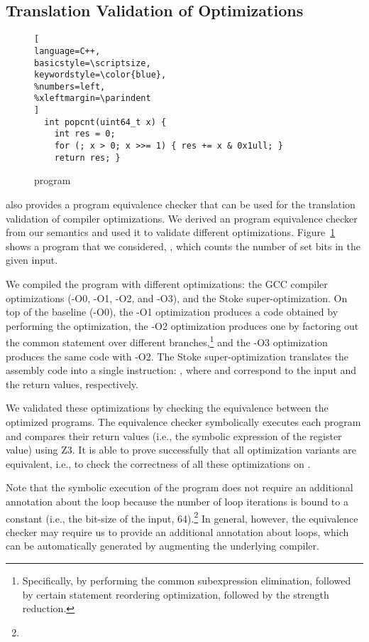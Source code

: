\subsection{Translation Validation of Optimizations}
\begin{figure}
\begin{lstlisting}[
language=C++,
basicstyle=\scriptsize,
keywordstyle=\color{blue},
%numbers=left,
%xleftmargin=\parindent
]
  int popcnt(uint64_t x) {
    int res = 0;
    for (; x > 0; x >>= 1) { res += x & 0x1ull; }
    return res; }
\end{lstlisting}
\caption{ program}
\label{fig:popcnt}
\end{figure}


\K also provides a program equivalence checker that can be used for the translation validation of compiler optimizations.
We derived an \ISA program equivalence checker from our semantics and used it to validate different optimizations.
Figure~\ref{fig:popcnt} shows a program that we considered, , which counts the number of set bits in the given input.

We compiled the program with different optimizations: the GCC compiler optimizations (-O0, -O1, -O2, and -O3), and the Stoke super-optimization.
On top of the baseline (-O0), the -O1 optimization produces a code obtained by performing the  optimization, the -O2 optimization produces one by factoring out the common statement over different branches,\footnote{Specifically, by performing the common subexpression elimination, followed by certain statement reordering optimization, followed by the strength reduction.} and the -O3 optimization produces the same code with -O2. The Stoke super-optimization translates the assembly code into a single instruction: , where  and  correspond to the input and the return values, respectively.

We validated these optimizations by checking the equivalence between the optimized programs.
The equivalence checker symbolically executes each program and compares their return values (i.e., the symbolic expression of the  register value) using Z3.
It is able to prove successfully that all optimization variants are equivalent, i.e., to check the correctness of all these optimizations on .

Note that the symbolic execution of the  program does not require an additional annotation about the loop because the number of loop iterations is bound to a constant (i.e., the bit-size of the input, 64).\footnote{%
}
In general, however, the equivalence checker may require us to provide an additional annotation about loops, which can be automatically generated by augmenting the underlying compiler.





